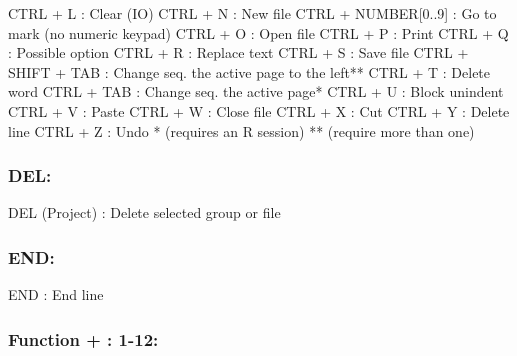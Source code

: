 \begin{Rtables}[caption={[CTRL keyboard shortcuts]
    CTRL keyboard shortcuts},
  label=shortcut:ctrl]
  CTRL + L                : Clear (IO)
  CTRL + N                : New file
  CTRL + NUMBER[0..9]     : Go to mark (no numeric keypad)
  CTRL + O                : Open file
  CTRL + P                : Print
  CTRL + Q                : Possible option
  CTRL + R                : Replace text
  CTRL + S                : Save file
  CTRL + SHIFT + TAB      : Change seq. the active page to the left**
  CTRL + T                : Delete word
  CTRL + TAB              : Change seq. the active page*
  CTRL + U                : Block unindent
  CTRL + V                : Paste
  CTRL + W                : Close file
  CTRL + X                : Cut
  CTRL + Y                : Delete line
  CTRL + Z                : Undo
  *  (requires an R session)
  ** (require more than one)
\end{Rtables}

\subsubsection{DEL:}

\vspace{-0.5cm}
\begin{Rtables}[caption={[DEL keyboard shortcut]
    DEL keyboard shortcut},
  label=shortcut:del]
  DEL (Project)   : Delete selected group or file
\end{Rtables}


\subsubsection{END:}

\vspace{-0.5cm}
\begin{Rtables}[caption={[END keyboard shortcut]
    END keyboard shortcut},
  label=shortcut:end]
  END             : End line
\end{Rtables}


\subsubsection{Function + : 1-12:}

